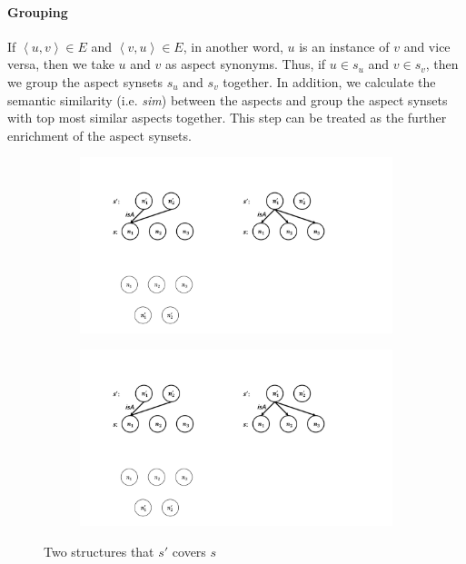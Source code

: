 \paragraph{Grouping}
\label{para:grouping}
If $\left\langle u,v\right\rangle \in E$ and
$\left\langle v,u\right\rangle \in E$, in another word,
$u$ is an instance of $v$ and vice versa, 
then we take $u$ and $v$ as aspect synonyms.
Thus, if $u \in s_u$ and $v \in s_v$, then 
we group the aspect synsets $s_u$ and $s_v$ together.
In addition, we calculate the semantic similarity 
(i.e. \textit{sim}) between the aspects and group
the aspect synsets with top most similar aspects together.
This step can be treated as the further enrichment 
of the aspect synsets.

\begin{figure}
	\centering
	\begin{subfigure}{.5\textwidth}
		\centering
		\includegraphics[width=.8\linewidth]{figures/subsumption_a}
		\caption{}
		\label{fig:subsumption_a}
	\end{subfigure}%
	\begin{subfigure}{.5\textwidth}
		\centering
		\includegraphics[width=.8\linewidth]{figures/subsumption_b}
		\caption{}
		\label{fig:subsumption_b}
	\end{subfigure}
	\caption{Two structures that $s'$ covers $s$}
	\label{fig:subsumption}
\end{figure}

